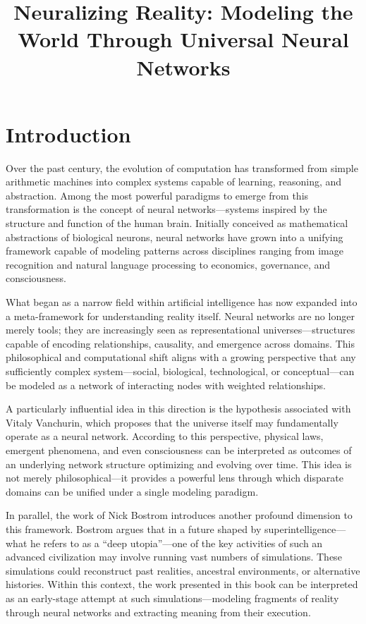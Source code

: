 \documentclass[12pt]{article}
\title{\textbf{Neuralizing Reality: Modeling the World Through Universal Neural Networks}}
\date{}
\begin{document}
\maketitle

\onehalfspacing

\section*{Introduction}

Over the past century, the evolution of computation has transformed from simple arithmetic machines into complex systems capable of learning, reasoning, and abstraction. Among the most powerful paradigms to emerge from this transformation is the concept of neural networks—systems inspired by the structure and function of the human brain. Initially conceived as mathematical abstractions of biological neurons, neural networks have grown into a unifying framework capable of modeling patterns across disciplines ranging from image recognition and natural language processing to economics, governance, and consciousness.

What began as a narrow field within artificial intelligence has now expanded into a meta-framework for understanding reality itself. Neural networks are no longer merely tools; they are increasingly seen as representational universes—structures capable of encoding relationships, causality, and emergence across domains. This philosophical and computational shift aligns with a growing perspective that any sufficiently complex system—social, biological, technological, or conceptual—can be modeled as a network of interacting nodes with weighted relationships.

A particularly influential idea in this direction is the hypothesis associated with Vitaly Vanchurin, which proposes that the universe itself may fundamentally operate as a neural network. According to this perspective, physical laws, emergent phenomena, and even consciousness can be interpreted as outcomes of an underlying network structure optimizing and evolving over time. This idea is not merely philosophical—it provides a powerful lens through which disparate domains can be unified under a single modeling paradigm.

In parallel, the work of Nick Bostrom introduces another profound dimension to this framework. Bostrom argues that in a future shaped by superintelligence—what he refers to as a ``deep utopia''—one of the key activities of such an advanced civilization may involve running vast numbers of simulations. These simulations could reconstruct past realities, ancestral environments, or alternative histories. Within this context, the work presented in this book can be interpreted as an early-stage attempt at such simulations—modeling fragments of reality through neural networks and extracting meaning from their execution.
\end{document}

